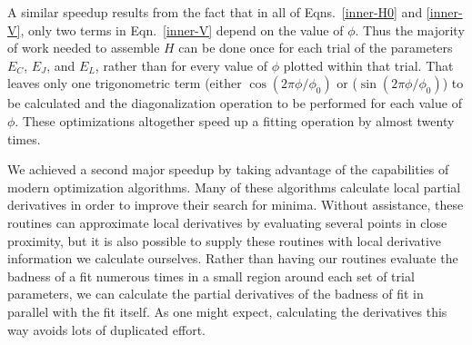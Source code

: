 \documentclass[twocolumn]{revtex4}
\begin{document}
A similar speedup results from the fact that in all of
Eqns.~\ref{inner-H0} and \ref{inner-V}, only two terms in
Eqn.~\ref{inner-V} depend on the value of $\phi$. Thus the majority of
work needed to assemble $H$ can be done once for each trial of the
parameters $E_C$, $E_J$, and $E_L$, rather than for every value of
$\phi$ plotted within that trial. That leaves only one trigonometric
term (either $\cos\left(2\pi\phi/\phi_0\right)$ or
($\sin\left(2\pi\phi/\phi_0\right)$) to be calculated and the
diagonalization operation to be performed for each value of
$\phi$. These optimizations altogether speed up a fitting operation by
almost twenty times.

We achieved a second major speedup by taking advantage of the
capabilities of modern optimization algorithms.\cite{Byrd}\cite{Zhu}
Many of these algorithms calculate local partial derivatives in order
to improve their search for minima. Without assistance, these routines
can approximate local derivatives by evaluating several points in
close proximity, but it is also possible to supply these routines with
local derivative information we calculate ourselves. Rather than
having our routines evaluate the badness of a fit numerous times in a
small region around each set of trial parameters, we can calculate the
partial derivatives of the badness of fit in parallel with the fit
itself. As one might expect, calculating the derivatives this way
avoids lots of duplicated effort.
\end{document}
